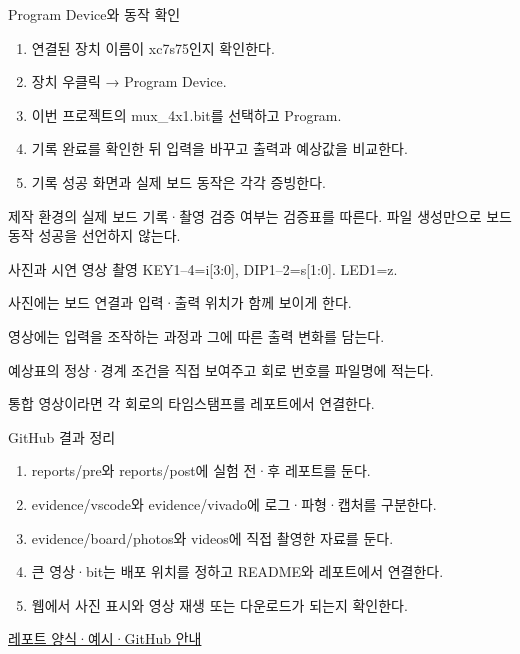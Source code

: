 \begin{frame}{Program Device와 동작 확인}\relax
\small
\begin{enumerate}\setlength{\itemsep}{0.22cm}
\item 연결된 장치 이름이 xc7s75인지 확인한다.
\item 장치 우클릭 → Program Device.
\item 이번 프로젝트의 mux\_4x1.bit를 선택하고 Program.
\item 기록 완료를 확인한 뒤 입력을 바꾸고 출력과 예상값을 비교한다.
\item 기록 성공 화면과 실제 보드 동작은 각각 증빙한다.
\end{enumerate}
제작 환경의 실제 보드 기록·촬영 검증 여부는 검증표를 따른다. 파일 생성만으로 보드 동작 성공을 선언하지 않는다.\par
\end{frame}

\begin{frame}{사진과 시연 영상 촬영}\relax
\small
KEY1–4=i[3:0], DIP1–2=s[1:0]. LED1=z.\par\vspace{0.22cm}사진에는 보드 연결과 입력·출력 위치가 함께 보이게 한다.\par\vspace{0.22cm}영상에는 입력을 조작하는 과정과 그에 따른 출력 변화를 담는다.\par\vspace{0.22cm}예상표의 정상·경계 조건을 직접 보여주고 회로 번호를 파일명에 적는다.\par\vspace{0.22cm}통합 영상이라면 각 회로의 타임스탬프를 레포트에서 연결한다.\par
\end{frame}

\begin{frame}{GitHub 결과 정리}\relax
\small
\begin{enumerate}\setlength{\itemsep}{0.22cm}
\item reports/pre와 reports/post에 실험 전·후 레포트를 둔다.
\item evidence/vscode와 evidence/vivado에 로그·파형·캡처를 구분한다.
\item evidence/board/photos와 videos에 직접 촬영한 자료를 둔다.
\item 큰 영상·bit는 배포 위치를 정하고 README와 레포트에서 연결한다.
\item 웹에서 사진 표시와 영상 재생 또는 다운로드가 되는지 확인한다.
\end{enumerate}
\href{https://github.com/Glaysia/ece2_26_2_2/blob/daily/0910/example/fpga_projects_hdl/LAB1/docs/reports.md}{레포트 양식·예시·GitHub 안내}
\end{frame}

